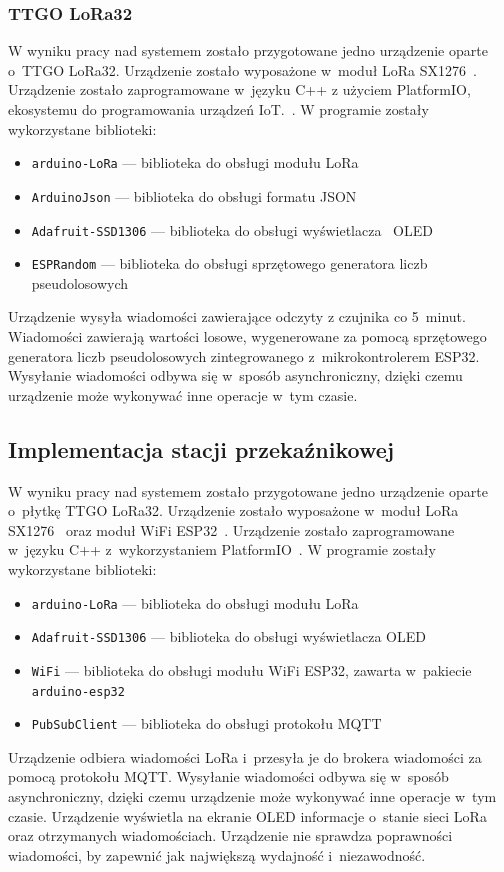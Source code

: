 \subsubsection{TTGO LoRa32}
W wyniku pracy nad systemem zostało przygotowane jedno urządzenie oparte o~TTGO LoRa32.
Urządzenie zostało wyposażone w~moduł LoRa SX1276~\cite{ESP32:sx1276-doc}.
Urządzenie zostało zaprogramowane w~języku C++ z użyciem PlatformIO, ekosystemu do programowania urządzeń IoT.~\cite{tool:pio}.
W programie zostały wykorzystane biblioteki:
\begin{itemize}
    \item \texttt{arduino-LoRa} — biblioteka do obsługi modułu LoRa~\cite{ESP32:lora-lib}
    \item \texttt{ArduinoJson} — biblioteka do obsługi formatu JSON~\cite{ESP32:ArduinoJson}
    \item \texttt{Adafruit-SSD1306} — biblioteka do obsługi wyświetlacza~\cite{ESP32:Adafruit-SSD1306} OLED
    \item \texttt{ESPRandom} — biblioteka do obsługi sprzętowego generatora liczb pseudolosowych~\cite{ESP32:ESPRandom}
\end{itemize}
Urządzenie wysyła wiadomości zawierające odczyty z czujnika co 5~minut.
Wiadomości zawierają wartości losowe, wygenerowane za pomocą sprzętowego generatora liczb pseudolosowych zintegrowanego z~mikrokontrolerem ESP32.
Wysyłanie wiadomości odbywa się w~sposób asynchroniczny, dzięki czemu urządzenie może wykonywać inne operacje w~tym czasie.

\subsection{Implementacja stacji przekaźnikowej}
W wyniku pracy nad systemem zostało przygotowane jedno urządzenie oparte o~płytkę TTGO LoRa32.
Urządzenie zostało wyposażone w~moduł LoRa SX1276~\cite{ESP32:sx1276-doc} oraz moduł WiFi ESP32~\cite{ESP32:datasheet}.
Urządzenie zostało zaprogramowane w~języku C++ z~wykorzystaniem PlatformIO~\cite{tool:pio}.
W programie zostały wykorzystane biblioteki:
\begin{itemize}
    \item \texttt{arduino-LoRa} — biblioteka do obsługi modułu LoRa~\cite{ESP32:lora-lib}
    \item \texttt{Adafruit-SSD1306} — biblioteka do obsługi wyświetlacza OLED~\cite{ESP32:Adafruit-SSD1306}
    \item \texttt{WiFi} — biblioteka do obsługi modułu WiFi ESP32, zawarta w~pakiecie \texttt{arduino-esp32}~\cite{ESP32:Arduino}
    \item \texttt{PubSubClient} — biblioteka do obsługi protokołu MQTT~\cite{ESP32:PubSubClient}
\end{itemize}
Urządzenie odbiera wiadomości LoRa i~przesyła je do brokera wiadomości za pomocą protokołu MQTT.
Wysyłanie wiadomości odbywa się w~sposób asynchroniczny, dzięki czemu urządzenie może wykonywać inne operacje w~tym czasie.
Urządzenie wyświetla na ekranie OLED informacje o~stanie sieci LoRa oraz otrzymanych wiadomościach.
Urządzenie nie sprawdza poprawności wiadomości, by zapewnić jak największą wydajność i~niezawodność.

